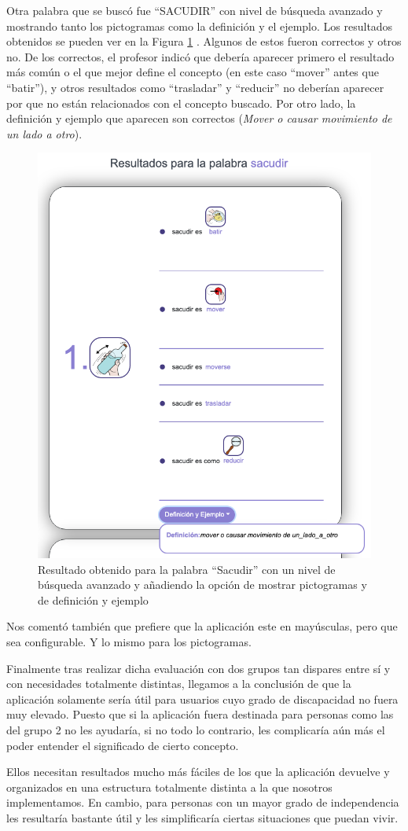 Otra palabra que se buscó fue ``SACUDIR'' con nivel de búsqueda avanzado y mostrando tanto los pictogramas como la definición y el ejemplo. Los resultados obtenidos se pueden ver en la Figura \ref{fig:sacudirAvanzado} . Algunos de estos fueron correctos y otros no. De los correctos, el profesor indicó que debería aparecer primero el resultado más común o el que mejor define el concepto (en este caso ``mover'' antes que ``batir''), y otros resultados como ``trasladar'' y ``reducir'' no deberían aparecer por que no están relacionados con el concepto buscado.
Por otro lado, la definición y ejemplo que aparecen son correctos (\textit{Mover o causar movimiento de un lado a otro}). 
\begin{figure}[!h]
	\includegraphics[width=.7\textwidth]{Imagenes/Bitmap/Capitulo4/EvaluacionFinal/sacudiravanzado.png}
	\centering
	\caption{Resultado obtenido para la palabra ``Sacudir'' con un nivel de búsqueda avanzado y añadiendo la opción de mostrar pictogramas y de definición y ejemplo}
	\label{fig:sacudirAvanzado}
\end{figure}

Nos comentó también que prefiere que la aplicación este en mayúsculas, pero que sea configurable. Y lo mismo para los pictogramas.

Finalmente tras realizar dicha evaluación con dos grupos tan dispares entre sí y con necesidades totalmente distintas, llegamos a la conclusión de que la aplicación solamente sería útil para usuarios cuyo grado de discapacidad no fuera muy elevado. Puesto que si la aplicación fuera destinada para personas como las del grupo 2 no les ayudaría, si no todo lo contrario, les complicaría aún más el poder entender el significado de cierto concepto.

Ellos necesitan resultados mucho más fáciles de los que la aplicación devuelve y organizados en una estructura totalmente distinta a la que nosotros implementamos. En cambio, para personas con un mayor grado de independencia les resultaría bastante útil y les simplificaría ciertas situaciones que puedan vivir.

